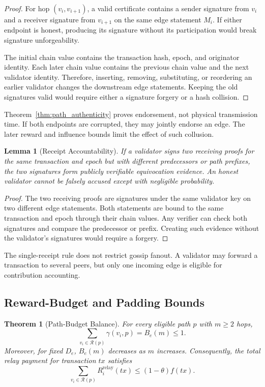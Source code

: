 \documentclass[lettersize,journal]{IEEEtran}
\newtheorem{theorem}{Theorem}
\newtheorem{lemma}{Lemma}
\begin{document}
\begin{proof}
For hop $(v_i,v_{i+1})$, a valid certificate contains a sender signature from $v_i$ and a receiver signature from $v_{i+1}$ on the same edge statement $M_i$.
If either endpoint is honest, producing its signature without its participation would break signature unforgeability.

The initial chain value contains the transaction hash, epoch, and originator identity.
Each later chain value contains the previous chain value and the next validator identity.
Therefore, inserting, removing, substituting, or reordering an earlier validator changes the downstream edge statements.
Keeping the old signatures valid would require either a signature forgery or a hash collision.
\end{proof}

Theorem~\ref{thm:path_authenticity} proves endorsement, not physical transmission time.
If both endpoints are corrupted, they may jointly endorse an edge.
The later reward and influence bounds limit the effect of such collusion.

\begin{lemma}[Receipt Accountability]
\label{lem:receipt_accountability}
If a validator signs two receiving proofs for the same transaction and epoch but with different predecessors or path prefixes, the two signatures form publicly verifiable equivocation evidence.
An honest validator cannot be falsely accused except with negligible probability.
\end{lemma}

\begin{proof}
The two receiving proofs are signatures under the same validator key on two different edge statements.
Both statements are bound to the same transaction and epoch through their chain values.
Any verifier can check both signatures and compare the predecessor or prefix.
Creating such evidence without the validator's signatures would require a forgery.
\end{proof}

The single-receipt rule does not restrict gossip fanout.
A validator may forward a transaction to several peers, but only one incoming edge is eligible for contribution accounting.


\subsection{Reward-Budget and Padding Bounds}

\begin{theorem}[Path-Budget Balance]
\label{thm:path_budget}
For every eligible path $p$ with $m\geq2$ hops,
\begin{equation}
\sum_{v_i\in\mathcal{R}(p)}
\gamma(v_i,p)
=
B_e(m)
\leq
1.
\end{equation}
Moreover, for fixed $D_e$, $B_e(m)$ decreases as $m$ increases.
Consequently, the total relay payment for transaction $tx$ satisfies
\begin{equation}
\sum_{v_i\in\mathcal{R}(p)}
R_i^{\mathrm{relay}}(tx)
\leq
(1-\theta)f(tx).
\end{equation}
\end{theorem}
\end{document}
